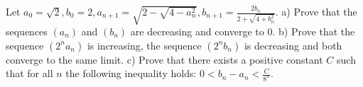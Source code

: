 Let $a_{0}=\sqrt{2}, b_{0}=2,a_{n+1}=\sqrt{2-\sqrt{4-a_{n}^{2}}},b_{n+1}=\frac{2b_{n}}{2+\sqrt{4+b_{n}^{2}}}$.
a) Prove that the sequences $(a_{n})$ and $(b_{n})$ are decreasing and converge to $0$.
b) Prove that the sequence $(2^{n}a_{n})$ is increasing,  the sequence $(2^{n}b_{n})$ is decreasing and
both converge to the same limit.
c) Prove that there exists a positive constant $C$ such that for all $n$  the following inequality holds: $0 <b_{n}-a_{n} <\frac{C}{8^{n}}$.